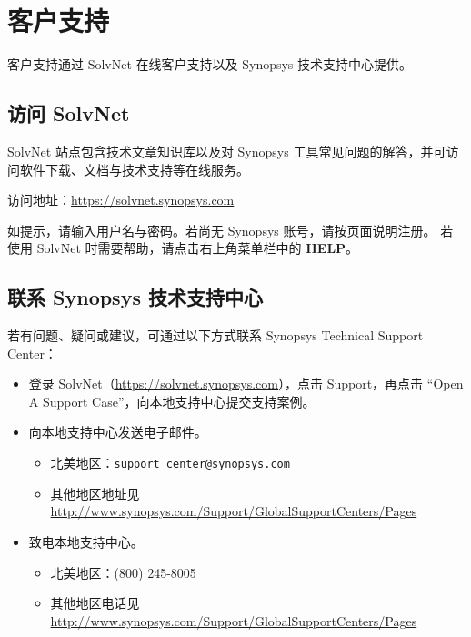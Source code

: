 \section*{客户支持}

客户支持通过 SolvNet 在线客户支持以及 Synopsys 技术支持中心提供。

\subsection*{访问 SolvNet}

SolvNet 站点包含技术文章知识库以及对 Synopsys 工具常见问题的解答，并可访问软件下载、文档与技术支持等在线服务。

访问地址：\url{https://solvnet.synopsys.com}

如提示，请输入用户名与密码。若尚无 Synopsys 账号，请按页面说明注册。
若使用 SolvNet 时需要帮助，请点击右上角菜单栏中的 \textbf{HELP}。

\subsection*{联系 Synopsys 技术支持中心}

若有问题、疑问或建议，可通过以下方式联系 Synopsys Technical Support Center：
\begin{itemize}
  \item 登录 SolvNet（\url{https://solvnet.synopsys.com}），点击 Support，再点击 ``Open A Support Case''，向本地支持中心提交支持案例。
  \item 向本地支持中心发送电子邮件。
  \begin{itemize}
    \item 北美地区：\texttt{support\_center@synopsys.com}
    \item 其他地区地址见 \url{http://www.synopsys.com/Support/GlobalSupportCenters/Pages}
  \end{itemize}
  \item 致电本地支持中心。
  \begin{itemize}
    \item 北美地区：(800) 245-8005
    \item 其他地区电话见 \url{http://www.synopsys.com/Support/GlobalSupportCenters/Pages}
  \end{itemize}
\end{itemize}
